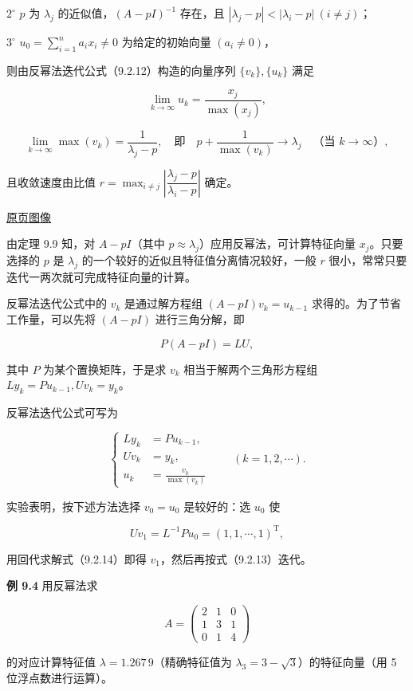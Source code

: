 \documentclass[
  10pt,
  fontset=fandol]{ctexart}
\begin{document}
\(2^\circ\) \(p\) 为 \(\lambda_j\) 的近似值，\((A-pI)^{-1}\) 存在，且 \(|\lambda_j-p|<|\lambda_i-p|\ (i\ne j)\)；

\(3^\circ\) \(u_0=\displaystyle\sum_{i=1}^na_ix_i\ne0\) 为给定的初始向量 \((a_i\ne0)\)，

则由反幂法迭代公式（9.2.12）构造的向量序列 \(\{v_k\},\{u_k\}\) 满足

\[
\lim_{k\to\infty}u_k=\frac{x_j}{\max(x_j)},
\]

\[
\lim_{k\to\infty}\max(v_k)=\frac1{\lambda_j-p},\quad\text{即}\quad p+\frac1{\max(v_k)}\to\lambda_j\quad\text{（当 }k\to\infty\text{）},
\]

且收敛速度由比值 \(r=\displaystyle\max_{i\ne j}\left|\dfrac{\lambda_j-p}{\lambda_i-p}\right|\) 确定。

\href{../../source-images/pdf-242.jpeg}{原页图像}

由定理 9.9 知，对 \(A-pI\)（其中 \(p\approx\lambda_j\)）应用反幂法，可计算特征向量 \(x_j\)。只要选择的 \(p\) 是 \(\lambda_j\) 的一个较好的近似且特征值分离情况较好，一般 \(r\) 很小，常常只要迭代一两次就可完成特征向量的计算。

反幂法迭代公式中的 \(v_k\) 是通过解方程组 \((A-pI)v_k=u_{k-1}\) 求得的。为了节省工作量，可以先将 \((A-pI)\) 进行三角分解，即

\[
P(A-pI)=LU,
\]

其中 \(P\) 为某个置换矩阵，于是求 \(v_k\) 相当于解两个三角形方程组 \(Ly_k=Pu_{k-1},Uv_k=y_k\)。

反幂法迭代公式可写为

\[
\left\{
\begin{aligned}
Ly_k&=Pu_{k-1},\\
Uv_k&=y_k,\\
u_k&=\frac{v_k}{\max(v_k)}
\end{aligned}
\right.\qquad(k=1,2,\cdots).
\tag{9.2.13}
\]

实验表明，按下述方法选择 \(v_0=u_0\) 是较好的：选 \(u_0\) 使

\[
Uv_1=L^{-1}Pu_0=(1,1,\cdots,1)^{\mathrm T},
\tag{9.2.14}
\]

用回代求解式（9.2.14）即得 \(v_1\)，然后再按式（9.2.13）迭代。

\textbf{例 9.4} 用反幂法求

\[
A=\begin{pmatrix}
2&1&0\\
1&3&1\\
0&1&4
\end{pmatrix}
\]

的对应计算特征值 \(\lambda=1.267\,9\)（精确特征值为 \(\lambda_3=3-\sqrt3\)）的特征向量（用 5 位浮点数进行运算）。
\end{document}
